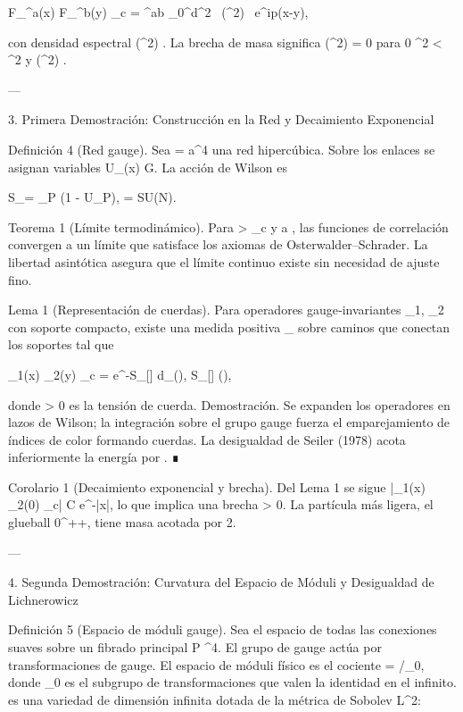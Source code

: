 \documentclass[12pt,twoside]{book}
\begin{document}
\langle F_{\mu\nu}^a(x) F_{\rho\sigma}^b(y) \rangle_c = \delta^{ab} \int_0^\infty d\mu^2 \, \rho(\mu^2) \int {} \,  e^{ip\cdot(x-y)},

con densidad espectral \rho(\mu^2) . La brecha de masa significa \rho(\mu^2) = 0 para 0 \le \mu^2 < \Delta^2 y \rho(\Delta^2) .

---

3. Primera Demostración: Construcción en la Red y Decaimiento Exponencial

Definición 4 (Red gauge). Sea \Lambda = a^4 una red hipercúbica. Sobre los enlaces se asignan variables U_\mu(x) \in G. La acción de Wilson es

S_\Lambda[U] = \beta \sum_P (1 - U_P), \quad \beta =   SU(N).

Teorema 1 (Límite termodinámico). Para \beta > \beta_c y a , las funciones de correlación convergen a un límite que satisface los axiomas de Osterwalder–Schrader. La libertad asintótica asegura que el límite continuo existe sin necesidad de ajuste fino.

Lema 1 (Representación de cuerdas). Para operadores gauge‑invariantes _1, _2 con soporte compacto, existe una medida positiva \mu_{} sobre caminos \gamma que conectan los soportes tal que

\langle {}_1(x) _2(y) \rangle_c = \int e^{-S_{}[\gamma]} d\mu_{}(\gamma), \quad S_{}[\gamma] \ge \sigma \cdot {}(\gamma),

donde \sigma > 0 es la tensión de cuerda. Demostración. Se expanden los operadores en lazos de Wilson; la integración sobre el grupo gauge fuerza el emparejamiento de índices de color formando cuerdas. La desigualdad de Seiler (1978) acota inferiormente la energía por \sigma \cdot {}. ∎

Corolario 1 (Decaimiento exponencial y brecha). Del Lema 1 se sigue |\langle {}_1(x) _2(0) \rangle_c| \le C e^{-\sigma |x|}, lo que implica una brecha \Delta \ge \sigma > 0. La partícula más ligera, el glueball 0^{++}, tiene masa acotada por 2\sqrt{\sigma}.

---

4. Segunda Demostración: Curvatura del Espacio de Móduli y Desigualdad de Lichnerowicz

Definición 5 (Espacio de móduli gauge). Sea  el espacio de todas las conexiones suaves sobre un fibrado principal P \to {}^4. El grupo de gauge  actúa por transformaciones de gauge. El espacio de móduli físico es el cociente  = /_0, donde _0 es el subgrupo de transformaciones que valen la identidad en el infinito.  es una variedad de dimensión infinita dotada de la métrica de Sobolev L^2:
\end{document}
